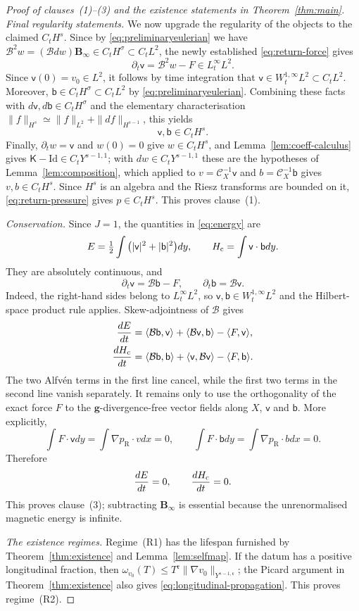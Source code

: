 \documentclass[11pt,reqno]{amsart}
\theoremstyle{plain}
\theoremstyle{definition}
\theoremstyle{remark}
\numberwithin{equation}{section}
\newcommand{\rpar}{\mathfrak r}
\newcommand{\Kmat}{\mathsf K}
\newcommand{\vLag}{\mathsf v}
\newcommand{\bLag}{\mathsf b}
\newcommand{\gmetric}{\mathbf g}
\newcommand{\Binf}{\mathbf B_\infty}
\begin{document}
\begin{proof}[Proof of clauses~\textup{(1)}--\textup{(3)} and the existence
statements in Theorem~\ref{thm:main}]
\textit{Final regularity statements.} We now upgrade the regularity of the objects to the claimed $C_t H^s$.  Since by \eqref{eq:preliminaryeulerian} we have $\mathcal B^2w=(\mathcal Bdw)\Binf\in C_tH^\sigma \subset  C_tL^2$, the newly established
\eqref{eq:return-force} gives
\[
 \partial_t\vLag=\mathcal B^2w-F\in L^\infty_tL^2.
\]
Since $\vLag(0)=v_0\in L^2$, it follows by time integration that
$\vLag\in W^{1,\infty}_tL^2\subset C_tL^2$. Moreover,
$\bLag\in C_tH^\sigma\subset C_tL^2$ by
\eqref{eq:preliminaryeulerian}. Combining these facts with
$d\vLag,d\bLag\in C_tH^\sigma$ and the elementary characterisation
$\|f\|_{H^s}\simeq\|f\|_{L^2}+\|df\|_{H^{s-1}}$, this yields
\[
 \vLag,\bLag\in C_tH^s.
\]
Finally, $\partial_tw=\vLag$ and $w(0)=0$ give $w\in C_tH^s$, and
Lemma~\ref{lem:coeff-calculus} gives $\Kmat-\mathrm{Id}\in C_tY^{s-1,1}$; with
$dw\in C_tY^{s-1,1}$ these are the hypotheses of Lemma~\ref{lem:composition},
which applied to $v=\mathcal C_X^{-1}\vLag$ and $b=\mathcal C_X^{-1}\bLag$
gives $v,b\in C_tH^s$.  Since $H^s$ is an algebra and the Riesz transforms
are bounded on it, \eqref{eq:return-pressure} gives $p\in C_tH^s$.  This proves clause~(1).

\emph{Conservation.}
Since $J=1$, the quantities in \eqref{eq:energy} are
\[
 E=\tfrac12\int\big(|\vLag|^2+|\bLag|^2\big) dy,\qquad
 H_{\rm c}=\int\vLag\cdot\bLag dy.
\]
They are absolutely continuous, and
\[
 \partial_t\vLag=\mathcal B\bLag-F,\qquad
 \partial_t\bLag=\mathcal B\vLag.
\]
Indeed, the right-hand sides belong to $L^\infty_tL^2$, so
$\vLag,\bLag\in W^{1,\infty}_tL^2$ and the Hilbert-space product rule
applies.  Skew-adjointness of $\mathcal B$ gives
\[
\begin{aligned}
 \frac{dE}{dt}
 &=\langle\mathcal B\bLag,\vLag\rangle
   +\langle\mathcal B\vLag,\bLag\rangle
   -\langle F,\vLag\rangle,\\
 \frac{dH_{\rm c}}{dt}
 &=\langle\mathcal B\bLag,\bLag\rangle
   +\langle\vLag,\mathcal B\vLag\rangle
   -\langle F,\bLag\rangle.
\end{aligned}
\]
The two Alfv\'en terms in the first line cancel, while the first two terms in
the second line vanish separately.  It remains only to use the orthogonality
of the exact force $F$ to the $\gmetric$-divergence-free vector fields along $X$,
$\vLag$ and $\bLag$.  More explicitly,
\[
 \int F\cdot\vLag dy
 =\int\nabla p_{\mathrm R}\cdot v dx=0,
 \qquad
 \int F\cdot\bLag dy
 =\int\nabla p_{\mathrm R}\cdot b dx=0.
\]
Therefore
\[
 \frac{dE}{dt}=0,\qquad \frac{dH_{\rm c}}{dt}=0.
\]
This proves clause~(3); subtracting $\Binf$ is essential because the
unrenormalised magnetic energy is infinite.

\emph{The existence regimes.}
Regime~\textup{(R1)} has the lifespan furnished by
Theorem~\ref{thm:existence} and Lemma~\ref{lem:selfmap}.  If the datum has a positive
longitudinal fraction, then
$\omega_{v_0}(T)\le T^{\rpar}
\|\nabla v_0\|_{Y^{s-1,\rpar}}$; the Picard argument in
Theorem~\ref{thm:existence} also gives \eqref{eq:longitudinal-propagation}.
This proves regime~\textup{(R2)}.
\end{proof}
\end{document}
